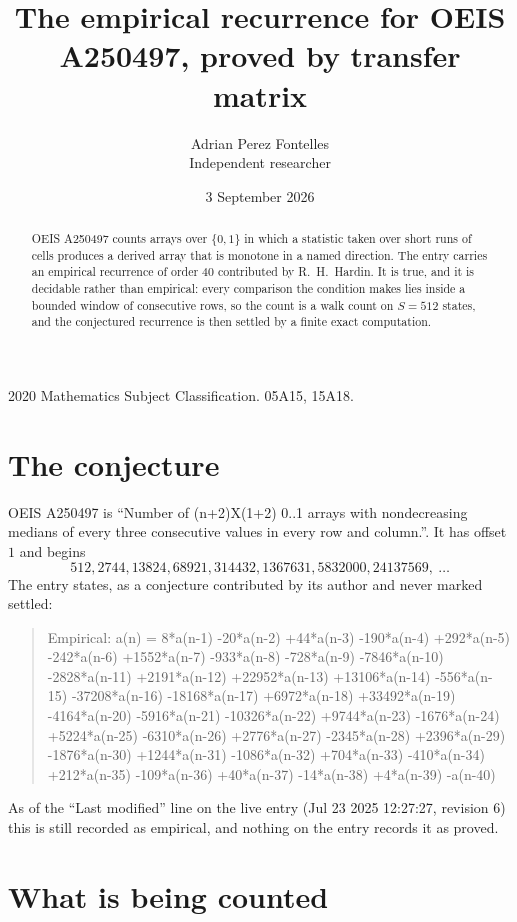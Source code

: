 \documentclass[11pt,a4paper]{article}
\title{The empirical recurrence for OEIS A250497, proved by transfer matrix}
\author{Adrian Perez Fontelles\\ \small Independent researcher}
\date{3 September 2026}
\theoremstyle{plain}
\theoremstyle{definition}
\begin{document}
\maketitle

\begin{abstract}
OEIS A250497 counts arrays over $\{0,1\}$ in which a statistic taken over short runs
of cells produces a derived array that is monotone in a named direction. The entry carries an
empirical recurrence of order $40$ contributed by R.~H.~Hardin. It is true, and it is
decidable rather than empirical: every comparison the condition makes lies inside a bounded
window of consecutive rows, so the count is a walk count on $S=512$ states, and the
conjectured recurrence is then settled by a finite exact computation.
\end{abstract}

\noindent\small 2020 Mathematics Subject Classification. 05A15, 15A18.\normalsize

\section{The conjecture}

OEIS A250497 is ``Number of (n+2)X(1+2) 0..1 arrays with nondecreasing medians of every three consecutive values in every row and column.''. It has offset $1$ and begins
\[
512, 2744, 13824, 68921, 314432, 1367631, 5832000, 24137569,\ \dots
\]
The entry states, as a conjecture contributed by its author and never marked settled:
\begin{quote}
Empirical: a(n) = 8*a(n-1) -20*a(n-2) +44*a(n-3) -190*a(n-4) +292*a(n-5) -242*a(n-6) +1552*a(n-7) -933*a(n-8) -728*a(n-9) -7846*a(n-10) -2828*a(n-11) +2191*a(n-12) +22952*a(n-13) +13106*a(n-14) -556*a(n-15) -37208*a(n-16) -18168*a(n-17) +6972*a(n-18) +33492*a(n-19) -4164*a(n-20) -5916*a(n-21) -10326*a(n-22) +9744*a(n-23) -1676*a(n-24) +5224*a(n-25) -6310*a(n-26) +2776*a(n-27) -2345*a(n-28) +2396*a(n-29) -1876*a(n-30) +1244*a(n-31) -1086*a(n-32) +704*a(n-33) -410*a(n-34) +212*a(n-35) -109*a(n-36) +40*a(n-37) -14*a(n-38) +4*a(n-39) -a(n-40)
\end{quote}
As of the ``Last modified'' line on the live entry (Jul 23 2025 12:27:27, revision 6) this is still
recorded as empirical, and nothing on the entry records it as proved.

\section{What is being counted}
\end{document}
